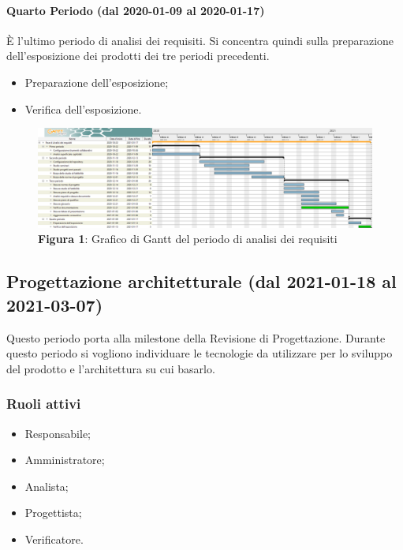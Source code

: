 \paragraph{Quarto Periodo (dal 2020-01-09 al 2020-01-17)}
È l'ultimo periodo di analisi dei requisiti. Si concentra quindi sulla preparazione dell'esposizione dei prodotti dei tre periodi precedenti.
\begin{itemize}
	\item Preparazione dell'esposizione;
	\item Verifica dell'esposizione.
\end{itemize}


\begin{landscape}
	\begin{figure}[H]
		\centering
		\includegraphics[width=\linewidth]{res/images/ganttFase1.png}
		\caption*{\textbf{Figura 1}{: Grafico di Gantt del periodo di analisi dei requisiti}}
		\label{fig:Gantt Analisi dei requisiti}
	\end{figure}
\end{landscape}




\subsection{Progettazione architetturale (dal 2021-01-18 al 2021-03-07)}

Questo periodo porta alla milestone della Revisione di Progettazione.
Durante questo periodo si vogliono individuare le tecnologie da utilizzare per lo sviluppo del prodotto e l'architettura su cui basarlo.
\subsubsection{Ruoli attivi}
\begin{itemize}
	\item Responsabile;
	\item Amministratore;
	\item Analista;
	\item Progettista;
	\item Verificatore.
\end{itemize}

